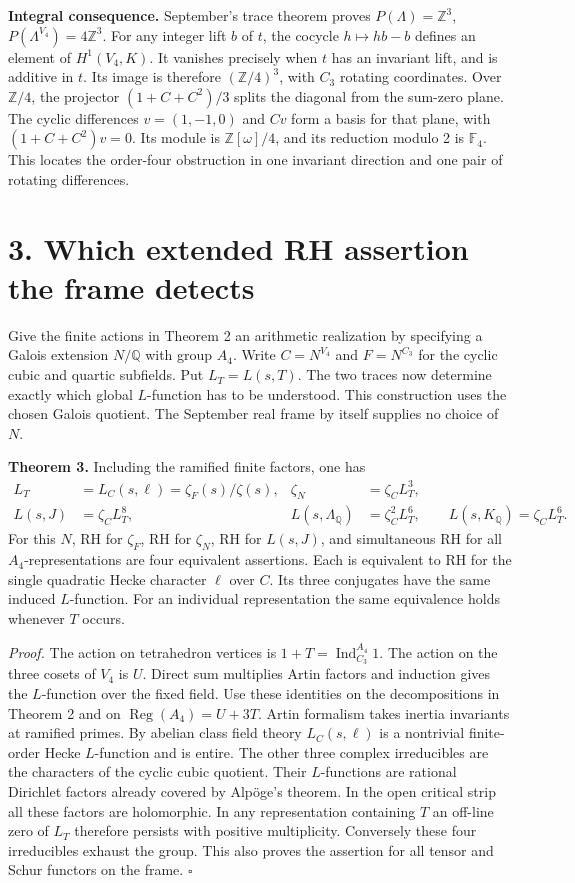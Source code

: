 \documentclass[11pt,a4paper]{article}
\newcommand{\Q}{\mathbb Q}
\newcommand{\Z}{\mathbb Z}
\newcommand{\Ind}{\operatorname{Ind}}
\newcommand{\Reg}{\operatorname{Reg}}
\begin{document}
\textbf{Integral consequence.} September's trace theorem proves $P(\Lambda)=\Z^3$, $P(\Lambda^{V_4})=4\Z^3$.
For any integer lift $b$ of $t$, the cocycle $h\mapsto hb-b$ defines an element of $H^1(V_4,K)$.
It vanishes precisely when $t$ has an invariant lift, and is additive in $t$. Its image is therefore
$(\Z/4)^3$, with $C_3$ rotating coordinates. Over $\Z/4$, the projector $(1+C+C^2)/3$ splits the diagonal
from the sum-zero plane. The cyclic differences $v=(1,-1,0)$ and $Cv$ form a basis for that plane, with
$(1+C+C^2)v=0$. Its module is $\Z[\omega]/4$, and its reduction modulo 2 is $\mathbb F_4$.
This locates the order-four obstruction in one invariant direction and one pair of rotating differences.

\newpage
\section*{3. Which extended RH assertion the frame detects}
Give the finite actions in Theorem 2 an arithmetic realization by specifying a Galois extension $N/\Q$ with
group $A_4$. Write $C=N^{V_4}$ and $F=N^{C_3}$ for the cyclic cubic and quartic subfields. Put $L_T=L(s,T)$.
The two traces now determine exactly which global $L$-function has to be understood. This construction uses the
chosen Galois quotient. The September real frame by itself supplies no choice of $N$.

\textbf{Theorem 3.} Including the ramified finite factors, one has
\[
\begin{aligned}
 L_T&=L_C(s,\ell)=\zeta_F(s)/\zeta(s),&
 \zeta_N&=\zeta_C L_T^3,\\
 L(s,J)&=\zeta_C L_T^8,&
 L(s,\Lambda_{\Q})&=\zeta_C^2 L_T^6,\qquad L(s,K_{\Q})=\zeta_C L_T^6.
\end{aligned}
\]
For this $N$, RH for $\zeta_F$, RH for $\zeta_N$, RH for $L(s,J)$, and simultaneous RH for all
$A_4$-representations are four equivalent assertions. Each is equivalent to RH for the single quadratic
Hecke character $\ell$ over $C$. Its three conjugates have the same induced $L$-function. For an individual
representation the same equivalence holds whenever $T$ occurs.

\textit{Proof.} The action on tetrahedron vertices is $1+T=\Ind_{C_3}^{A_4}1$. The action on the three cosets
of $V_4$ is $U$. Direct sum multiplies Artin factors and induction gives the $L$-function over the fixed field.
Use these identities on the decompositions in Theorem 2 and on $\Reg(A_4)=U+3T$. Artin formalism takes inertia
invariants at ramified primes. By abelian class field theory $L_C(s,\ell)$ is a nontrivial finite-order Hecke
$L$-function and is entire. The other three complex irreducibles are the characters of the cyclic cubic
quotient. Their $L$-functions are rational Dirichlet factors already covered by Alpöge's theorem.
In the open critical strip all these factors are holomorphic. In any representation containing $T$ an off-line
zero of $L_T$ therefore persists with positive multiplicity. Conversely these four irreducibles exhaust the group.
This also proves the assertion for all tensor and Schur functors on the frame. \hfill$\square$
\end{document}
